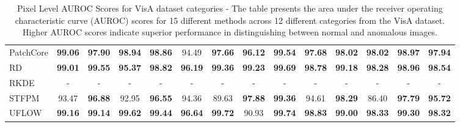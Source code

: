 \begin{table}[h!]
{\begin{tabular}{l*{13}{c}}
        PatchCore & \textbf{99.06} & \textbf{97.90} & \textbf{98.94} & \textbf{98.86} & 94.49 & \textbf{97.66} & \textbf{96.12} & \textbf{99.54} & \textbf{97.68} & \textbf{98.02} & \textbf{98.02} & \textbf{98.97} & \textbf{97.94} \\
        RD & \textbf{99.01} & \textbf{99.55} & \textbf{95.37} & \textbf{98.82} & \textbf{96.19} & \textbf{99.36} & \textbf{99.23} & \textbf{99.69} & \textbf{98.78} & \textbf{99.18} & \textbf{98.28} & \textbf{98.96} & \textbf{98.54} \\
        RKDE & - & - & - & - & - & - & - & - & - & - & - & - & - \\
        STFPM & 93.47 & \textbf{96.88} & 92.95 & \textbf{96.55} & 94.36 & 89.63 & \textbf{97.88} & \textbf{99.36} & 94.61 & \textbf{98.29} & 86.40 & \textbf{97.79} & \textbf{95.72} \\
        UFLOW & \textbf{99.16} & \textbf{99.14} & \textbf{99.62} & \textbf{99.44} & \textbf{96.64} & \textbf{99.72} & 90.93 & \textbf{99.74} & \textbf{98.83} & \textbf{99.00} & \textbf{98.33} & \textbf{99.30} & \textbf{98.32} \\
        \bottomrule
        \end{tabular}
    }
    \caption{Pixel Level AUROC Scores for VisA\cite{Zou_2022_visa} dataset categories - The table presents the area under the receiver operating characteristic curve (AUROC) scores for 15 different methods across 12 different categories from the VisA dataset. Higher AUROC scores indicate superior performance in distinguishing between normal and anomalous images.}
    \label{table:VisA Pixel AUROC}
\end{table}